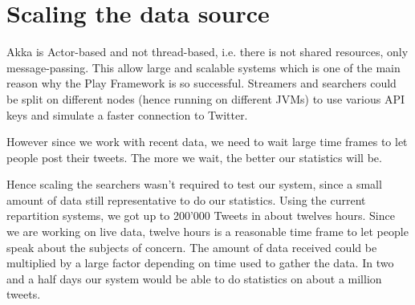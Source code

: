 \section{Scaling the data source}

Akka is Actor-based and not thread-based, i.e. there is not shared resources, only message-passing. This allow large and scalable systems which is one of the main reason why the Play Framework is so successful. Streamers and searchers could be split on different nodes (hence running on different JVMs) to use various API keys and simulate a faster connection to Twitter.

However since we work with recent data, we need to wait large time frames to let people post their tweets. The more we wait, the better our statistics will be.

Hence scaling the searchers wasn't required to test our system, since a small amount of data still representative to do our statistics. Using the current repartition systems, we got up to 200'000 Tweets in about twelves hours. Since we are working on live data, twelve hours is a reasonable time frame to let people speak about the subjects of concern. The amount of data received could be multiplied by a large factor depending on time used to gather the data. In two and a half days our system would be able to do statistics on about a million tweets.
